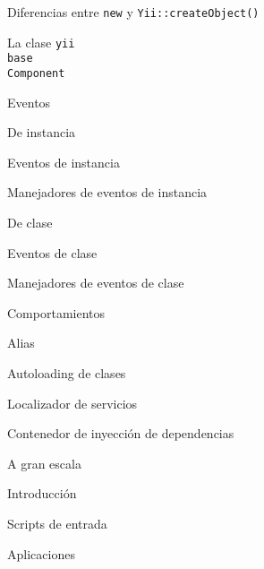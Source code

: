\begin{longenum}
\begin{longenum}
\begin{longenum}
\begin{longenum}
\begin{longenum}
\begin{longenum}
                        \item Diferencias entre \texttt{new} y \texttt{Yii::createObject()}
                    \end{longenum}
                \end{longenum}
                \item La clase \texttt{yii\\base\\Component}
                \begin{longenum}
                    \item Eventos
                    \begin{longenum}
                        \item De instancia
                        \begin{longenum}
                            \item Eventos de instancia
                            \item Manejadores de eventos de instancia
                        \end{longenum}
                        \item De clase
                        \begin{longenum}
                            \item Eventos de clase
                            \item Manejadores de eventos de clase
                        \end{longenum}
                    \end{longenum}
                    \item Comportamientos
                \end{longenum}
            \end{longenum}
            \item Alias
            \item Autoloading de clases
            \item Localizador de servicios
            \item Contenedor de inyección de dependencias
        \end{longenum}
        \item A gran escala
        \begin{longenum}
            \item Introducción
            \item Scripts de entrada
            \item Aplicaciones

\end{longenum}
\end{longenum}
\end{longenum}
